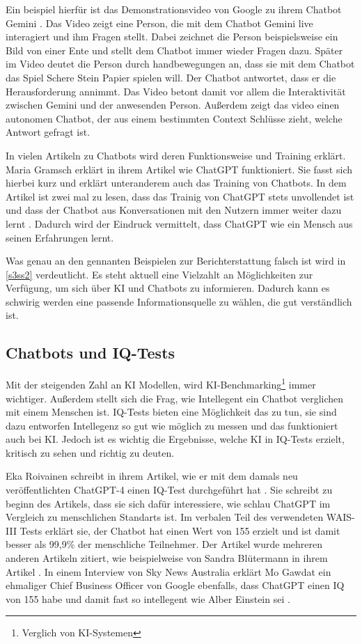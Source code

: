 	Ein beispiel hierfür ist das Demonstrationsvideo von Google zu ihrem Chatbot Gemini \cite{gminiDemo2023}. 
	Das Video zeigt eine Person, die mit dem Chatbot Gemini live interagiert und ihm Fragen stellt. Dabei
	zeichnet die Person beispielsweise ein Bild von einer Ente und stellt dem Chatbot immer wieder Fragen dazu.
	Später im Video deutet die Person durch handbewegungen an, dass sie mit dem Chatbot das Spiel \glqq{}Schere
	Stein Papier\grqq{} spielen will. Der Chatbot antwortet, dass er die Herausforderung annimmt. Das Video
	betont damit vor allem die Interaktivität zwischen Gemini und der anwesenden Person. Außerdem zeigt das
	video einen autonomen Chatbot, der aus einem bestimmten Context Schlüsse zieht, welche Antwort gefragt ist. 

	In vielen Artikeln zu Chatbots wird deren Funktionsweise und Training erklärt. Maria Gramsch erklärt in 
	ihrem Artikel wie ChatGPT funktioniert. Sie fasst sich hierbei kurz und erklärt unteranderem
	auch das Training von Chatbots. In dem Artikel ist zwei mal zu lesen, dass das Trainig von ChatGPT stets
	unvollendet ist und dass der Chatbot aus Konversationen mit den Nutzern immer weiter dazu lernt \cite{gramsch23}. 
	Dadurch wird der Eindruck vermittelt, dass ChatGPT wie ein Mensch aus seinen Erfahrungen lernt.

	Was genau an den gennanten Beispielen zur Berichterstattung falsch ist wird in \ref{s3ss2} verdeutlicht. 
	Es steht aktuell eine Vielzahlt an Möglichkeiten zur Verfügung, um sich über KI und Chatbots zu informieren. 
	Dadurch kann es schwirig werden eine passende Informationsquelle zu wählen, die gut verständlich ist.   	 	 
	
	\clearpage
	\subsection{Chatbots und IQ-Tests}\label{s1ss3}
	Mit der steigenden Zahl an KI Modellen, wird KI-Benchmarking\footnote{Verglich von KI-Systemen} immer wichtiger. 
	Außerdem stellt sich die Frag, wie Intellegent ein Chatbot verglichen mit einem Menschen ist. IQ-Tests 
	bieten eine Möglichkeit das zu tun, sie sind dazu entworfen Intellegenz so gut wie möglich zu messen und das 
	funktioniert auch bei KI. Jedoch ist es wichtig die Ergebnisse, welche KI in IQ-Tests erzielt, kritisch zu
	sehen und richtig zu deuten.

	Eka Roivainen schreibt in ihrem Artikel, wie er mit dem damals neu veröffentlichten ChatGPT-4 einen IQ-Test
	durchgeführt hat \cite{roivainen23}. Sie schreibt zu beginn des Artikels, dass sie sich dafür interessiere, wie
	schlau ChatGPT im Vergleich zu menschlichen Standarts ist. Im verbalen Teil des verwendeten WAIS-III Tests
	erklärt sie, der Chatbot hat einen Wert von 155 erzielt und ist damit besser als 99,9\% der menschliche Teilnehmer.
	Der Artikel wurde mehreren anderen Artikeln zitiert, wie beispielweise von Sandra Blütermann in ihrem Artikel
	\cite{blutermann23}. In einem Interview von Sky News Australia erklärt Mo Gawdat ein ehmaliger Chief Business
	Officer von Google ebenfalls, dass ChatGPT einen IQ von 155 habe und damit fast so intellegent wie Alber Einstein
	sei \cite{gawdat23}.

